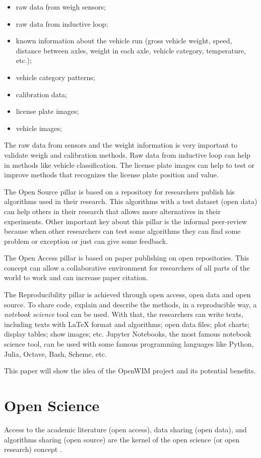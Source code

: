 \documentclass[a4paper]{article}
\begin{document}
{\begin{itemize}
\item raw data from weigh sensors;
\item raw data from inductive loop;
\item known information about the vehicle run (gross vehicle weight, speed, distance between axles, weight in each axle, vehicle category, temperature, etc.);
\item vehicle category patterns;
\item calibration data;
\item license plate images;
\item vehicle images;
\end{itemize}

The raw data from sensors and the weight information is very important to validate weigh and calibration methods. Raw data from inductive loop can help in methods like vehicle classification. The license plate images can help to test or improve methods that recognizes the license plate position and value.

The Open Source pillar is based on a repository for researchers publish his algorithms used in their research. This algorithms with a test dataset (open data) can help others in their research that allows more alternatives in their experiments. Other important key about this pillar is the informal peer-review because when other researchers can test some algorithms they can find some problem or exception or just can give some feedback.

The Open Access pillar is based on paper publishing on open repositories. This concept can allow a collaborative environment for researchers of all parts of the world to work and can increase paper citation.

The Reproducibility pillar is achieved through open access, open data and open source. To share code, explain and describe the methods, in a reproducible way, a \textit{notebook science} tool can be used. With that, the researchers can write texts, including texts with LaTeX format and algorithms; open data files; plot charts; display tables; show images; etc. Jupyter Notebooks, the most famous notebook science tool, can be used with some famous programming languages like Python, Julia, Octave, Bash, Scheme, etc.

This paper will show the idea of the OpenWIM project and its potential benefits.

\section{Open Science}\label{open-science}
Access to the academic literature (open access), data sharing (open data), and algorithms sharing (open source) are the kernel of the open science (or open research) concept \cite{article:the-open-research-value-proposition}.

}
\end{document}
